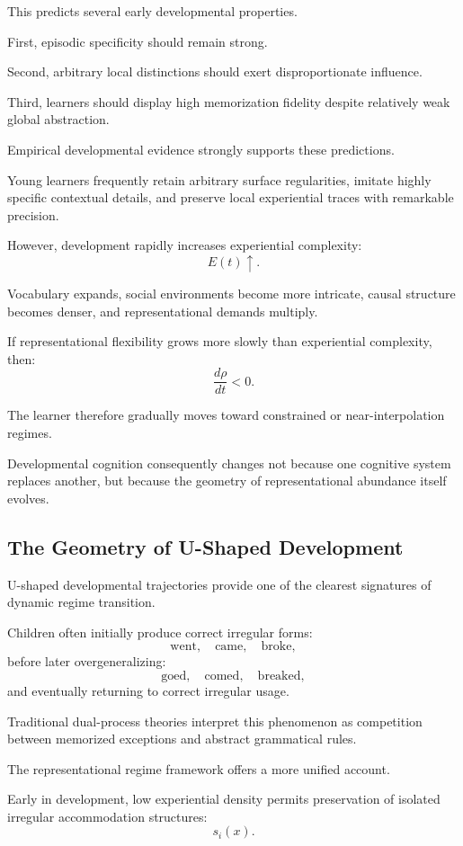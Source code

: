 \documentclass[12pt,a4paper]{article}
\begin{document}
This predicts several early developmental properties.

First, episodic specificity should remain strong.

Second, arbitrary local distinctions should exert disproportionate influence.

Third, learners should display high memorization fidelity despite relatively weak global abstraction.

Empirical developmental evidence strongly supports these predictions.

Young learners frequently retain arbitrary surface regularities, imitate highly specific contextual details, and preserve local experiential traces with remarkable precision.

However, development rapidly increases experiential complexity:
\[
E(t)
\uparrow.
\]

Vocabulary expands, social environments become more intricate, causal structure becomes denser, and representational demands multiply.

If representational flexibility grows more slowly than experiential complexity, then:
\[
\frac{d\rho}{dt}
<
0.
\]

The learner therefore gradually moves toward constrained or near-interpolation regimes.

Developmental cognition consequently changes not because one cognitive system replaces another, but because the geometry of representational abundance itself evolves.

\subsection{The Geometry of U-Shaped Development}

U-shaped developmental trajectories provide one of the clearest signatures of dynamic regime transition.

Children often initially produce correct irregular forms:
\[
\text{went},
\quad
\text{came},
\quad
\text{broke},
\]
before later overgeneralizing:
\[
\text{goed},
\quad
\text{comed},
\quad
\text{breaked},
\]
and eventually returning to correct irregular usage.

Traditional dual-process theories interpret this phenomenon as competition between memorized exceptions and abstract grammatical rules.

The representational regime framework offers a more unified account.

Early in development, low experiential density permits preservation of isolated irregular accommodation structures:
\[
s_i(x).
\]
\end{document}
